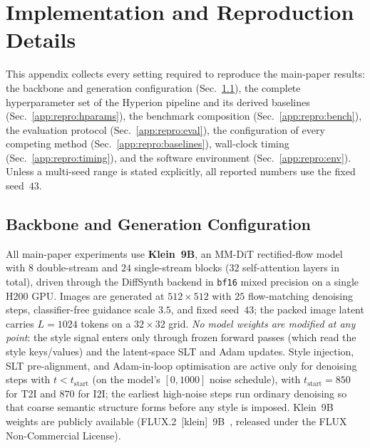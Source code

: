 \clearpage
\onecolumn
\appendices

\section{Implementation and Reproduction Details}
\label{app:repro}

This appendix collects every setting required to reproduce the main-paper
results: the backbone and generation configuration
(Sec.~\ref{app:repro:backbone}), the complete hyperparameter set of the Hyperion
pipeline and its derived baselines (Sec.~\ref{app:repro:hparams}), the benchmark
composition (Sec.~\ref{app:repro:bench}), the evaluation protocol
(Sec.~\ref{app:repro:eval}), the configuration of every competing method
(Sec.~\ref{app:repro:baselines}), wall-clock timing
(Sec.~\ref{app:repro:timing}), and the software environment
(Sec.~\ref{app:repro:env}). Unless a multi-seed range is stated explicitly, all
reported numbers use the fixed seed~$43$.

\subsection{Backbone and Generation Configuration}
\label{app:repro:backbone}
All main-paper experiments use \textbf{Klein~9B}, an MM-DiT rectified-flow model
with $8$ double-stream and $24$ single-stream blocks ($32$ self-attention layers
in total), driven through the DiffSynth backend in \texttt{bf16} mixed precision
on a single H200 GPU. Images are generated at $512\times512$ with $25$
flow-matching denoising steps, classifier-free guidance scale $3.5$, and fixed
seed~$43$; the packed image latent carries $L=1024$ tokens on a $32\times32$
grid. \emph{No model weights are modified at any point}: the style signal enters
only through frozen forward passes (which read the style keys/values) and the
latent-space SLT and Adam updates. Style injection, SLT pre-alignment, and
Adam-in-loop optimisation are active only for denoising steps with
$t<t_\text{start}$ (on the model's $[0,1000]$ noise schedule), with
$t_\text{start}=850$ for T2I and $870$ for I2I; the earliest high-noise steps run
ordinary denoising so that coarse semantic structure forms before any style is
imposed.
Klein~9B weights are publicly available (FLUX.2~[klein]~9B~\cite{flux2klein2025},
released under the FLUX Non-Commercial License).

